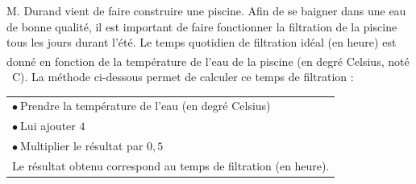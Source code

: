 \documentclass[exercice,a4]{thedocument}%
\begin{document}
%
    
    \def\euro{\texteuro}%
    \def\degres{\textsuperscript{\textdegree}}%

\medskip

M. Durand vient de faire construire une piscine. Afin de se baigner dans une eau de bonne qualité, il est important de faire fonctionner la filtration de la piscine tous les jours durant l'été. Le temps quotidien de filtration idéal (en heure) est donné en fonction de la température de l'eau de la piscine (en degré Celsius, noté \degres~C). La méthode ci-dessous permet de calculer ce temps de filtration :

\begin{center}
\begin{tabularx}{0.67\linewidth}{|X|}\hline
$\bullet~$Prendre la température de l'eau (en degré Celsius)\\
$\bullet~$Lui ajouter $4$\\
$\bullet~$Multiplier le résultat par $0,5$\\

Le résultat obtenu correspond au temps de filtration (en heure).\\ \hline
\end{tabularx}
\end{center}
\end{document}
